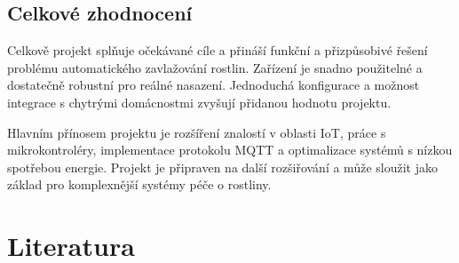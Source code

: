 \documentclass[a4paper, 11pt]{article}
\begin{document}
\subsection{Celkové zhodnocení}

Celkově projekt splňuje očekávané cíle a přináší funkční a přizpůsobivé řešení problému automatického zavlažování rostlin. Zařízení je snadno použitelné 
a dostatečně robustní pro reálné nasazení. Jednoduchá konfigurace a možnost integrace s chytrými domácnostmi zvyšují přidanou hodnotu projektu.

Hlavním přínosem projektu je rozšíření znalostí v oblasti IoT, práce s mikrokontroléry, implementace protokolu MQTT a optimalizace systémů s nízkou spotřebou energie. 
Projekt je připraven na další rozšiřování a může sloužit jako základ pro komplexnější systémy péče o rostliny.

\newpage
\section{Literatura}


\end{document}
